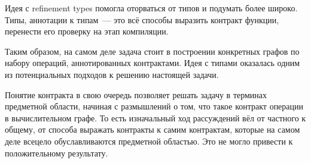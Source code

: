 Идея с refinement types помогла оторваться от типов и подумать более широко.
Типы, аннотации к типам~--- это всё способы выразить контракт функции, перенести его проверку на этап компиляции.

Таким образом, на самом деле задача стоит в построении конкретных графов по набору операций, аннотированных контрактами. Идея с типами оказалась одним из потенциальных подходов к решению настоящей задачи.

Понятие контракта в свою очередь позволяет решать задачу в терминах предметной области, начиная с размышлений о том, что такое контракт операции в вычислительном графе.
То есть изначальный ход рассуждений вёл от частного к общему, от способа выражать контракты к самим контрактам, которые на самом деле всецело обуславливаются предметной областью. Это не могло привести к положительному результату.
